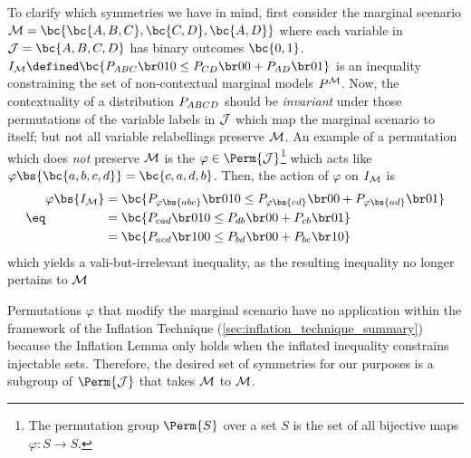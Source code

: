 \documentclass[aps, 10pt, english, twoside, pra, nofootinbib, tightenlines, longbibliography, superscriptaddress]{revtex4-1}
\begin{document}
    To clarify which symmetries we have in mind, first consider the marginal scenario $\mscenario = \bc{\bc{A, B, C}, \bc{C, D}, \bc{A, D}}$ where each variable in $\jointvar = \bc{A,B,C,D}$ has binary outcomes $\bc{0,1}$. ${I_{\mscenario} \defined \bc{\prob[ABC][010] \leq \prob[CD][00] + \prob[AD][01]}}$ is an inequality constraining the set of non-contextual marginal models $\prob^{\mscenario}$. Now, the contextuality of a distribution $\prob[ABCD]$ should be \textit{invariant} under those permutations of the variable labels in $\mathcal{J}$  which map the marginal scenario to itself; but not all variable relabellings preserve $\mathcal{M}$. An example of a permutation which does \emph{not} preserve $\mathcal{M}$ is the $\varphi \in \Perm{\jointvar}$\footnote{The permutation group $\Perm{S}$ over a set $S$ is the set of all bijective maps $\varphi : S \to S$.} which acts like $\varphi\bs{\bc{a,b,c,d}} = \bc{c,a,d,b}$. Then, the action of $\varphi$ on $I_{\mathcal{M}}$ is
    \begin{align*}
    \eq \label{eq:symmetry_example}
    \begin{split}
        \varphi\bs{I_{\mscenario}} &= \bc{\prob[\varphi\bs{abc}][010] \leq \prob[\varphi\bs{cd}][00] + \prob[\varphi\bs{ad}][01]} \\
        &= \bc{\prob[cad][010] \leq \prob[db][00] + \prob[cb][01]} \\
        &= \bc{\prob[acd][100] \leq \prob[bd][00] + \prob[bc][10]}
    \end{split}
    \end{align*}
    which yields a vali-but-irrelevant inequality, as the resulting inequality no longer pertains to  $\mathcal{M}$%

    Permutations $\varphi$ that modify the marginal scenario have no application within the framework of the Inflation Technique (\cref{sec:inflation_technique_summary}) because the Inflation Lemma only holds when the inflated inequality constrains injectable sets. Therefore, the desired set of symmetries for our purposes is a subgroup of $\Perm{\jointvar}$ that takes $\mathcal{M}$ to $\mathcal{M}$.
\end{document}
